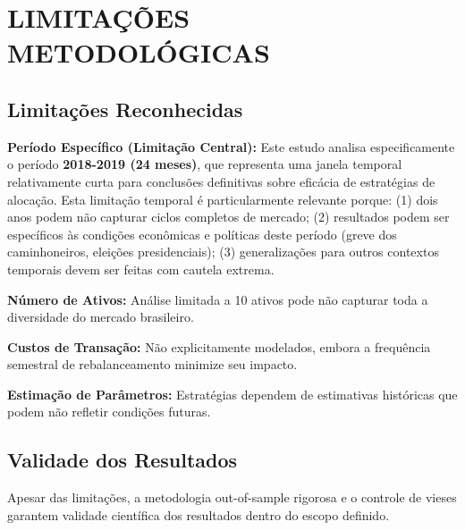 \section{LIMITAÇÕES METODOLÓGICAS}

\subsection{Limitações Reconhecidas}

\textbf{Período Específico (Limitação Central):} Este estudo analisa especificamente o período \textbf{2018-2019 (24 meses)}, que representa uma janela temporal relativamente curta para conclusões definitivas sobre eficácia de estratégias de alocação. Esta limitação temporal é particularmente relevante porque: (1) dois anos podem não capturar ciclos completos de mercado; (2) resultados podem ser específicos às condições econômicas e políticas deste período (greve dos caminhoneiros, eleições presidenciais); (3) generalizações para outros contextos temporais devem ser feitas com cautela extrema.

\textbf{Número de Ativos:} Análise limitada a 10 ativos pode não capturar toda a diversidade do mercado brasileiro.

\textbf{Custos de Transação:} Não explicitamente modelados, embora a frequência semestral de rebalanceamento minimize seu impacto.

\textbf{Estimação de Parâmetros:} Estratégias dependem de estimativas históricas que podem não refletir condições futuras.

\subsection{Validade dos Resultados}

Apesar das limitações, a metodologia out-of-sample rigorosa e o controle de vieses garantem validade científica dos resultados dentro do escopo definido.